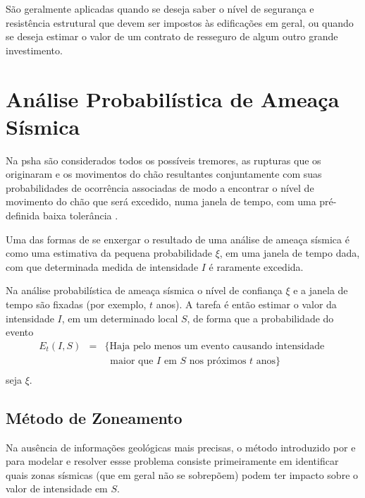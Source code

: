 São geralmente aplicadas quando
se deseja saber o nível de segurança e resistência estrutural que devem ser impostos
às edificações em geral, ou quando se deseja estimar o valor de um contrato de resseguro
de algum outro grande investimento.


\section{Análise Probabilística de Ameaça Sísmica }
\label{sec:psha}


Na \gls{psha} são considerados todos os possíveis tremores, as rupturas que os originaram e os movimentos do chão
resultantes conjuntamente com suas probabilidades de ocorrência associadas de modo a encontrar o nível de movimento do
chão que será excedido, numa janela de tempo, com uma pré-definida baixa tolerância \citep{baker_2008-1}.

Uma das formas de se enxergar o resultado de uma análise de ameaça sísmica
é como uma estimativa da pequena probabilidade $\xi$, em uma janela de tempo dada,
com que determinada medida de intensidade $I$ é raramente excedida.

Na análise probabilística de ameaça sísmica o nível de confiança $\xi$
e a janela de tempo são fixadas (por exemplo, $t$ anos). A tarefa é então estimar
o valor da intensidade $I$, em um determinado local $S$, de forma que a probabilidade
do evento
\begin{equation} \label{eventEt}
\begin{array}{lll}
 E_t(I, S)&=&\{\mbox{Haja pelo menos um evento causando intensidade }  \\
 &&  \;\;\mbox{maior que $I$ em }S  \mbox{ nos próximos }t \mbox{ anos}\} \\
\end{array}
\end{equation}
seja $\xi$.


\subsection{Método de Zoneamento}
\label{sec:zoneamento}

Na ausência de informações geológicas mais precisas, o método introduzido por \citet{cornell_1968} e
\citet{mcguire_1976} para modelar e resolver essse problema consiste
primeiramente em identificar quais zonas sísmicas (que em geral não se sobrepõem)
podem ter impacto sobre o valor de intensidade em $S$.

